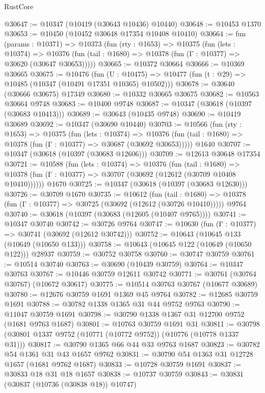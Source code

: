 \begin{lexlean}{RustCore}
\begin{coremodule}
@30647 := @10347 (@10419 (@30643 @10436) @10440)
@30648 := @10453 @1370
@30653 := @10450 (@10452 @30648 @17354 @10408 @10410)
@30664 := fun (params : @10371) =>
  @10373
    (fun (rty : @1653) =>
    @10375
      (fun (lets : @10374) =>
      @10376 (fun (tail : @1680) => @10378 (fun (Γ : @10377) => @30620 (@30647 @30653)))))
@30665 := @10372 @30664
@30666 := @10369 @30665
@30675 := @10476
    (fun (U : @10475) => @10477 (fun (t : @29) => @10485 (@10347 (@10491 @17351 @10365) @10502)))
@30678 := @30640 (@30666 @30675) @17349
@30680 := @10332 @30665 @30675
@30682 := @10563 @30664 @9748
@30683 := @10400 @9748
@30687 := @10347 (@30618 (@10397 (@30683 @10413)))
@30689 := @30643 (@10435 @9748)
@30690 := @10419 @30689
@30692 := @10347 (@30690 @10440)
@30703 := @10566
    (fun (rty : @1653) =>
    @10375
      (fun (lets : @10374) =>
      @10376 (fun (tail : @1680) => @10378 (fun (Γ : @10377) => @30687 (@30692 @30653)))))
    @1640
@30707 := @10347 (@30618 (@10397 (@30683 @12606)))
@30709 := @12613 @30648 @17354
@30721 := @10588
    (fun (lets : @10374) =>
    @10376
      (fun (tail : @1680) =>
      @10378 (fun (Γ : @10377) => @30707 (@30692 (@12612 (@30709 @10408 @10410))))))
    @1670
@30725 := @10347 (@30618 (@10397 (@30683 @12630)))
@30726 := @30709 @1670
@30735 := @10612
    (fun (tail : @1680) => @10378 (fun (Γ : @10377) => @30725 (@30692 (@12612 (@30726 @10410)))))
    @9764
@30740 := @30618 (@10397 (@30683 (@12605 (@10407 @9765))))
@30741 := @10347 @30740
@30742 := @30726 @9764
@30747 := @10630 (fun (Γ : @10377) => @30741 (@30692 (@12612 @30742)))
@30752 := @10643 (@10645 @133 (@10649 (@10650 @133)))
@30758 := @10643 (@10645 @122 (@10649 (@10650 @122))) @28937
@30759 := @30752 @30758
@30760 := @30747 @30759
@30761 := @10514 @30740
@30763 := @30690 (@10439 @30759)
@30764 := @10347 @30763
@30767 := @10446 @30759 @12611 @30742
@30771 := @30761 (@30764 @30767) (@10672 @30617)
@30775 := @10514 @30763 @30767 (@10677 @30689)
@30780 := @12676 @30759 @1691 @1369 @45 @9764
@30782 := @12685 @30759 @1691
@30788 := @30782 @1338 @1365 @31 @44 @9752 @9763
@30790 := @11047 @30759 @1691
@30798 := @30790 @1338 @1367 @31 @12700 @9752 (@1681 @9763 @1687)
@30801 := @10763 @30759 @1691 @31
@30811 := @30798 (@30801 @1337 @9752 (@10771 (@10772 @9752)) (@10776 (@10778 @1337 @31)))
@30817 := @30790 @1365 @66 @44 @33 @9763 @1687
@30823 := @30782 @54 @1361 @31 @43 @1657 @9762
@30831 := @30790 @54 @1363 @31 @12728 @1657 (@1681 @9762 @1687)
@30833 := @10728 @30759 @1691
@30837 := @30833 @18 @31 @18 @1657
@30838 := @10737 @30759
@30843 := @30831 (@30837 (@10736 (@30838 @18)) @10747)

\end{coremodule}
\end{lexlean}
